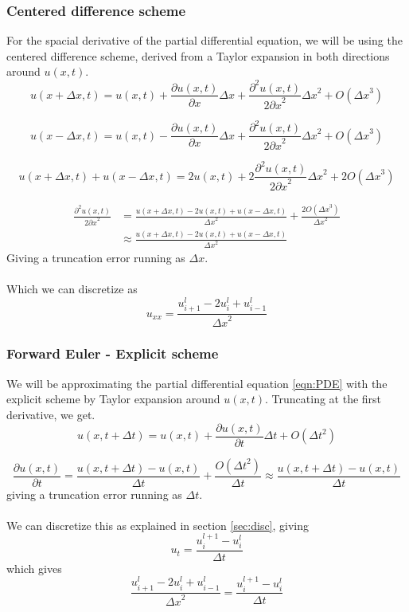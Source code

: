 \documentclass[10pt,a4paper]{article}
\newcommand{\dt}{{\Delta t}}
\newcommand{\dx}{{\Delta x}}
\newcommand{\pt}{{\partial t}}
\newcommand{\px}{{\partial x}}
\newcommand{\pu}{{\partial u}}
\newcommand{\ppu}{{\partial^2 u}}
\begin{document}
\subsubsection{Centered difference scheme}
For the spacial derivative of the partial differential equation, we will be using the centered difference scheme, derived from a Taylor expansion in both directions around $u(x,t)$.
\begin{equation}
u(x+\Delta x, t) = u(x,t) + \frac{\pu(x,t)}{\px}\dx + \frac{\ppu(x,t)}{2\px^2}\dx^2 + O(\dx^3)
\end{equation}

\begin{equation}
u(x-\Delta x, t) = u(x,t) - \frac{\pu(x,t)}{\px}\dx + \frac{\ppu(x,t)}{2\px^2}\dx^2 + O(\dx^3)
\end{equation}

\begin{equation}
u(x+\Delta x, t) + u(x-\Delta x, t) = 2u(x,t) + 2\frac{\ppu(x,t)}{2\px^2}\dx^2 + 2O(\dx^3)
\end{equation}

\begin{equation}\begin{split}
\frac{\ppu(x,t)}{2\px^2} &= \frac{u(x+\Delta x, t) - 2u(x,t) + u(x-\Delta x, t)}{\dx^2} + \frac{2O(\dx^3)}{\dx^2}\\
&\approx \frac{u(x+\Delta x, t) - 2u(x,t) + u(x-\Delta x, t)}{\dx^2}
\end{split}\end{equation}
Giving a truncation error running as $\dx$.\\\\
Which we can discretize as
\begin{equation}
u_{xx} = \frac{u_{i+1}^l - 2u_i^l+u_{i-1}^l}{\dx^2}
\end{equation}


\subsubsection{Forward Euler - Explicit scheme}
We will be approximating the partial differential equation \ref{eqn:PDE} with the explicit scheme by Taylor expansion around $u(x,t)$. Truncating at the first derivative, we get.
\begin{equation}
u(x,t+\dt) = u(x,t) + \frac{\pu(x,t)}{\pt}\dt + O(\dt^2)
\end{equation}

\begin{equation}
\frac{\pu(x,t)}{\pt} = \frac{u(x,t+\dt) - u(x,t)}{\dt} + \frac{O(\dt^2)}{\dt} \approx \frac{u(x,t+\dt) - u(x,t)}{\dt}
\end{equation}
giving a truncation error running as $\dt$.
\\\\
We can discretize this as explained in section \ref{sec:disc}, giving
\begin{equation}
u_t = \frac{u_i^{l+1} - u_i^l}{\dt}
\end{equation}
which gives
\begin{equation}
\frac{u_{i+1}^l - 2u_i^l+u_{i-1}^l}{\dx^2} = \frac{u_i^{l+1} - u_i^l}{\dt}
\end{equation}
\end{document}
